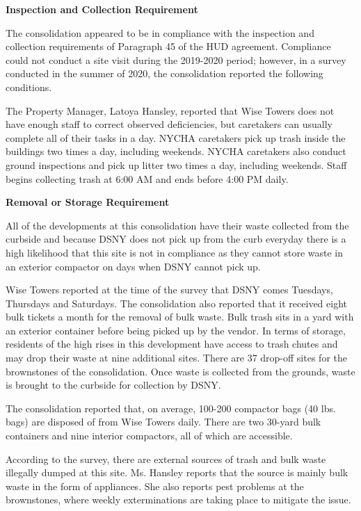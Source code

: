 
\textbf{Inspection and Collection Requirement}

The consolidation appeared to be in compliance with the inspection and collection requirements of Paragraph 45 of the HUD agreement. Compliance could not conduct a site visit during the 2019-2020 period; however, in a survey conducted in the summer of 2020, the consolidation reported the following conditions.

The Property Manager, Latoya Hansley, reported that Wise Towers does not have enough staff to correct observed deficiencies, but caretakers can usually complete all of their tasks in a day. NYCHA caretakers pick up trash inside the buildings two times a day, including weekends. NYCHA caretakers also conduct ground inspections and pick up litter two times a day, including weekends. Staff begins collecting trash at 6:00 AM and ends before 4:00 PM daily.

\textbf{Removal or Storage Requirement}

All of the developments at this consolidation have their waste collected from the curbside and because DSNY does not pick up from the curb everyday there is a high likelihood that this site is not in compliance as they cannot store waste in an exterior compactor on days when DSNY cannot pick up.

Wise Towers reported at the time of the survey that DSNY comes Tuesdays, Thursdays and Saturdays. The consolidation also reported that it received eight bulk tickets a month for the removal of bulk waste. Bulk trash sits in a yard with an exterior container before being picked up by the vendor. In terms of storage, residents of the high rises in this development have access to trash chutes and may drop their waste at nine additional sites. There are 37 drop-off sites for the brownstones of the consolidation. Once waste is collected from the grounds, waste is brought to the curbside for collection by DSNY. 

The consolidation reported that, on average, 100-200 compactor bags (40 lbs. bags) are disposed of from Wise Towers daily. There are two 30-yard bulk containers and nine interior compactors, all of which are accessible. 

According to the survey, there are external sources of trash and bulk waste illegally dumped at this site. Ms. Hansley reports that the source is mainly bulk waste in the form of appliances. She also reports pest problems at the brownstones, where weekly exterminations are taking place to mitigate the issue. 